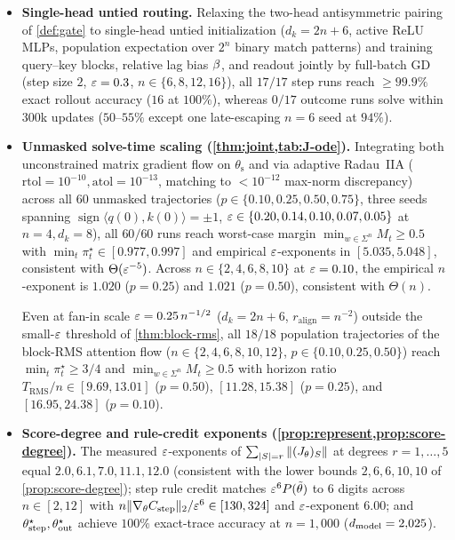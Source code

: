 \begin{itemize}[leftmargin=*]
\item \textbf{Single-head untied routing.} Relaxing the two-head antisymmetric pairing of \cref{def:gate} to single-head untied initialization ($d_k = 2n+6$, active ReLU MLPs, population expectation over $2^n$ binary match patterns) and training query--key blocks, relative lag bias $\beta$, and readout jointly by full-batch GD (step size $2$, $\varepsilon = 0.3$, $n \in \{6,8,12,16\}$), all $17/17$ step runs reach $\ge 99.9\%$ exact rollout accuracy ($16$ at $100\%$), whereas $0/17$ outcome runs solve within $300$k updates ($50$--$55\%$ except one late-escaping $n=6$ seed at $94\%$).
\item \textbf{Unmasked \stepode{} solve-time scaling (\cref{thm:joint,tab:J-ode}).} Integrating both unconstrained matrix gradient flow on $\theta_{\mathrm s}$ and \stepode{} via adaptive Radau~IIA ($\mathrm{rtol}=10^{-10}, \mathrm{atol}=10^{-13}$, matching to $<10^{-12}$ max-norm discrepancy) across all $60$ unmasked trajectories ($p \in \{0.10, 0.25, 0.50, 0.75\}$, three seeds spanning $\operatorname{sign}\langle q(0),k(0)\rangle = \pm 1$, $\varepsilon \in \{0.20, 0.14, 0.10, 0.07, 0.05\}$ at $n=4, d_k=8$), all $60/60$ runs reach worst-case margin $\min_{w\in\Sigma^n} M_t \ge 0.5$ with $\min_t\pi_t^\star \in [0.977, 0.997]$ and empirical $\varepsilon$-exponents in $[5.035, 5.048]$, consistent with $\Theta(\varepsilon^{-5})$. Across $n \in \{2,4,6,8,10\}$ at $\varepsilon = 0.10$, the empirical $n$-exponent is $1.020$ ($p=0.25$) and $1.021$ ($p=0.50$), consistent with $\Theta(n)$.

Even at fan-in scale $\varepsilon = 0.25\,n^{-1/2}$ ($d_k = 2n+6$, $r_{\mathrm{align}} = n^{-2}$) outside the small-$\varepsilon$ threshold of \cref{thm:block-rms}, all $18/18$ population trajectories of the block-RMS attention flow ($n \in \{2,4,6,8,10,12\}$, $p \in \{0.10, 0.25, 0.50\}$) reach $\min_t\pi_t^\star \ge 3/4$ and $\min_{w\in\Sigma^n} M_t \ge 0.5$ with horizon ratio $T_{\mathrm{RMS}}/n \in [9.69, 13.01]$ ($p=0.50$), $[11.28, 15.38]$ ($p=0.25$), and $[16.95, 24.38]$ ($p=0.10$).
\item \textbf{Score-degree and rule-credit exponents (\cref{prop:represent,prop:score-degree}).} The measured $\varepsilon$-exponents of $\sum_{|S|=r}\|(J_\theta)_S\|$ at degrees $r = 1, \ldots, 5$ equal $2.0, 6.1, 7.0, 11.1, 12.0$ (consistent with the lower bounds $2, 6, 6, 10, 10$ of \cref{prop:score-degree}); step rule credit matches $\varepsilon^6 P(\tilde\theta)$ to $6$ digits across $n \in [2,12]$ with \mbox{$n\|\nabla_\theta C_{\mathrm{step}}\|_2/\varepsilon^6 \in [130, 324]$} and $\varepsilon$-exponent $6.00$; and $\theta^\star_{\mathrm{step}}, \theta^\star_{\mathrm{out}}$ achieve $100\%$ exact-trace accuracy at $n = 1{,}000$ ($d_{\mathrm{model}} = 2{,}025$).
\end{itemize}

